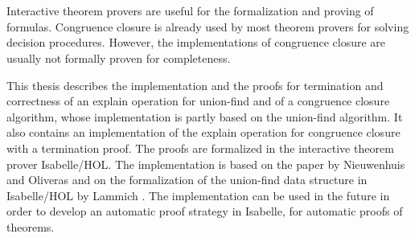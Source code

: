 \chapter{\abstractname}

Interactive theorem provers are useful for the formalization and proving of formulas. Congruence closure is already used by most theorem provers for solving decision procedures. However, the implementations of congruence closure are usually not formally proven for completeness.

This thesis describes the implementation and the proofs for termination and correctness of an explain operation for union-find and of a congruence closure algorithm, whose implementation is partly based on the union-find algorithm. It also contains an implementation of the explain operation for congruence closure with a termination proof. The proofs are formalized in the interactive theorem prover Isabelle/HOL. The implementation is based on the paper by Nieuwenhuis and Oliveras \cite{Nieuwenhuis} and on the formalization of the union-find data structure in Isabelle/HOL by Lammich \cite{unionfind-isabelle}. The implementation can be used in the future in order to develop an automatic proof strategy in Isabelle, for automatic proofs of theorems.
